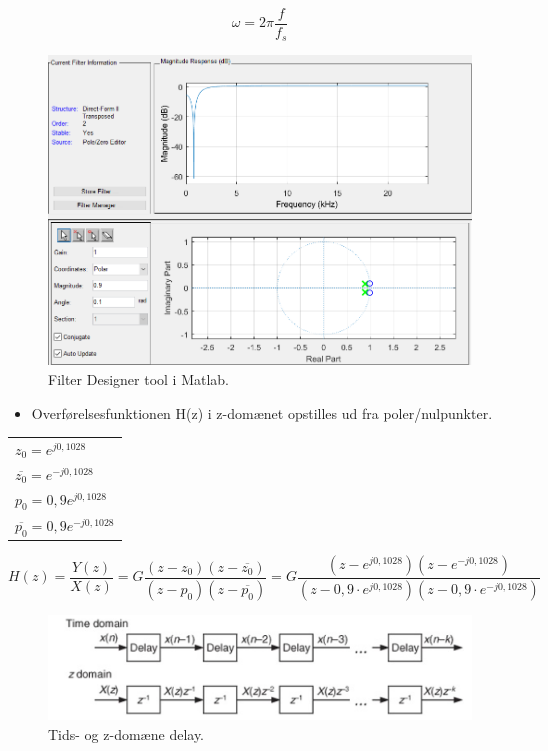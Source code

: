 \documentclass[danish]{article}
\begin{document}
\begin{equation}
\omega = 2\pi \frac{f}{f_s}
\end{equation}

\begin{figure}[H]
	\centering
	\includegraphics[width=0.6\linewidth]{graphics/notchfilter}
	\caption{Filter Designer tool i Matlab.}
	\label{fig:notchfilter}
\end{figure}

\begin{itemize}
	\item Overførelsesfunktionen H(z) i z-domænet opstilles ud fra poler/nulpunkter.
\end{itemize}

{\setlength\parindent{24pt}
\begin{tabular}{l}
	$z_0 =  e^{j0,1028}$ \\ 
	
	$\overline{z_0} =  e^{-j0,1028}$ \\ 
	
	$p_0 = 0,9 e^{j0,1028}$ \\ 
	
	$ \overline{p_0} = 0,9 e^{-j0,1028}$ \\ 
\end{tabular}} 

\begin{equation}
H(z) = \frac{Y(z)}{X(z)} = G \frac{(z - z_0)(z-\overline{z_0})}{(z - p_0)(z-\overline{p_0})} = G \frac{(z - e^{j0,1028})(z - e^{-j0,1028})}{(z - 0,9\cdot  e^{j0,1028})(z-0,9\cdot e^{-j0,1028})}
\end{equation}

\begin{figure}[H]
	\centering
	\includegraphics[width=0.6\linewidth]{graphics/z_domain_delay}
	\caption{Tids- og z-domæne delay.}
	\label{fig:z_domain_delay}
\end{figure}
\end{document}
